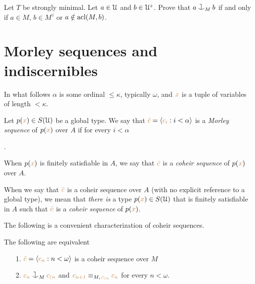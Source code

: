 \begin{exercise}
  Let $T$ be strongly minimal.
  Let $a\in\EuScript U$ and $b\in\EuScript U^z$.
  Prove that $a\cnonfork_Mb$ if and only if $a\in M$, $b\in M^z$ or $a\notin\mathop{\rm acl}(M,b)$.
\end{exercise}

\section{Morley sequences and indiscernibles}

In what follows $\alpha$ is some ordinal $\le\kappa$, typically $\omega$, and ${\color{brown} x}$ is a tuple of variables of length $<\kappa$.

Let \mbox{$p({\color{brown} x})\in S(\EuScript U)$} be a global type.
We say that ${\color{brown}\bar c}=\langle{\color{brown}c_i}:i<\alpha\rangle$ is a \emph{Morley sequence\/} of $p({\color{brown} x})$ over $A$ if for every $i<\alpha$

.

When $p({\color{brown} x})$ is finitely satisfiable in $A$, we say that ${\color{brown}\bar c}$ is a \emph{coheir sequence\/} of $p({\color{brown} x})$ over $A$.

When we say that ${\color{brown}\bar c}$ is a coheir sequence over $A$ (with no explicit reference to a global type), we mean that \textit{there is\/} a type $p({\color{brown} x})\in S(\EuScript U)$ that is finitely satisfiable in $A$ such that ${\color{brown}\bar c}$ is a \emph{coheir sequence\/} of $p({\color{brown} x})$.

The following is a convenient characterization of coheir sequences.

\begin{lemma}\label{lem_coheir_property}
The following are equivalent
\begin{itemize}
\item[1.] ${\color{brown}\bar c}=\langle{\color{brown}c_n}:n<\omega\rangle$ is a coheir sequence over $M$
\item[2.] ${\mr c_n}\cnonfork_M{\mr c_{\restriction n}}$ and ${\color{brown} c_{n+1}}\equiv_{M,\,{\color{brown} c_{\restriction n}}}{\color{brown} c_n}$ for every $n<\omega$.
\end{itemize}
\end{lemma}

